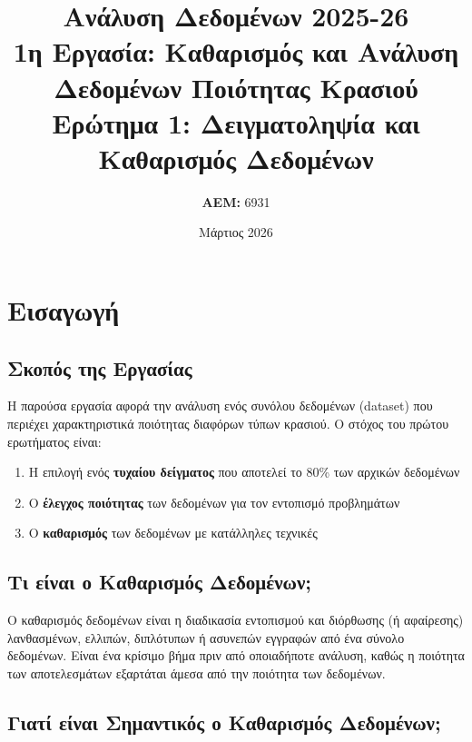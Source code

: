 \documentclass[12pt,a4paper]{article}
\title{
    \vspace{-1cm}
    \textbf{Ανάλυση Δεδομένων 2025-26}\\
    \large 1η Εργασία: Καθαρισμός και Ανάλυση Δεδομένων Ποιότητας Κρασιού\\
    \vspace{0.5cm}
    \normalsize Ερώτημα 1: Δειγματοληψία και Καθαρισμός Δεδομένων
}
\author{
    \textbf{ΑΕΜ:} 6931
}
\date{Μάρτιος 2026}
\begin{document}
\maketitle

\tableofcontents
\newpage

\section{Εισαγωγή}

\subsection{Σκοπός της Εργασίας}

Η παρούσα εργασία αφορά την ανάλυση ενός συνόλου δεδομένων (dataset) που περιέχει χαρακτηριστικά ποιότητας διαφόρων τύπων κρασιού. Ο στόχος του πρώτου ερωτήματος είναι:

\begin{enumerate}
    \item Η επιλογή ενός \textbf{τυχαίου δείγματος} που αποτελεί το 80\% των αρχικών δεδομένων
    \item Ο \textbf{έλεγχος ποιότητας} των δεδομένων για τον εντοπισμό προβλημάτων
    \item Ο \textbf{καθαρισμός} των δεδομένων με κατάλληλες τεχνικές
\end{enumerate}

\subsection{Τι είναι ο Καθαρισμός Δεδομένων;}

\begin{infobox}
Ο καθαρισμός δεδομένων είναι η διαδικασία εντοπισμού και διόρθωσης (ή αφαίρεσης) λανθασμένων, ελλιπών, διπλότυπων ή ασυνεπών εγγραφών από ένα σύνολο δεδομένων. Είναι ένα κρίσιμο βήμα πριν από οποιαδήποτε ανάλυση, καθώς η ποιότητα των αποτελεσμάτων εξαρτάται άμεσα από την ποιότητα των δεδομένων.
\end{infobox}

\subsection{Γιατί είναι Σημαντικός ο Καθαρισμός Δεδομένων;}
\end{document}
